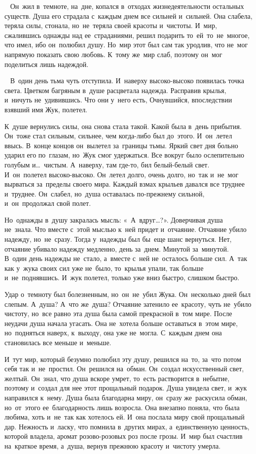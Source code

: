 ~
Он~жил в~темноте, на~дне, копался в~отходах жизнедеятельности остальных существ.
Душа его страдала с~каждым днем все сильней и~сильней.
Она слабела, теряла силы, стонала, но~не~теряла своей красоты и~чистоты.
И~мир, сжалившись однажды над ее~страданиями, решил подарить то~ей~то~не~многое, что имел, ибо он~полюбил душу.
Но~мир этот был сам так уродлив, что не~мог напрямую показать свою любовь.
К~тому же~мир слаб, поэтому он~мог поделиться лишь надеждой.

~
В~один день тьма чуть отступила.
И~наверху высоко-высоко появилась точка света.
Цветком багряным в~душе расцветала надежда.
Расправив крылья, и~ничуть не~удивившись.
Что они у~него есть, Очнувшийся, впоследствии взявший имя Жук, полетел.
 
К~душе вернулись силы, она снова стала такой.
Какой была в~день прибытия.
Он~тоже стал сильным, сильнее, чем когда-либо был до~этого.
И~он~летел ввысь.
В~конце концов он~вылетел за~границы тьмы.
Яркий свет дня больно ударил его по~глазам, но~Жук смог удержаться.
Все вокруг было ослепительно голубым и…~чистым.
А~наверху, там где-то, бил белый-белый свет.
И~он~полетел высоко-высоко.
Он~летел долго, очень долго, но~так и~не~мог вырваться за~пределы своего мира.
Каждый взмах крыльев давался все труднее и~труднее.
Он~слабел, но~душа оставалась по-прежнему сильной, и~он~продолжал свой полет.
 
Но~однажды в~душу закралась мысль: «~А~вдруг…?».
Доверчивая душа не~знала.
Что вместе с~этой мыслью к~ней придет и~отчаяние.
Отчаяние убило надежду, но~не~сразу.
Тогда у~надежды был бы~еще шанс вернуться.
Нет, отчаяние убивало надежду медленно, день за~днем.
Минутой за~минутой.
В~один день надежды не~стало, а~вместе с~ней не~осталось больше сил.
А~так как у~жука своих сил уже не~было, то~крылья упали, так больше и~не~поднявшись.
И~жук полетел, только уже вниз быстро, слишком быстро.
 
Удар о~темноту был болезненным, но~он~не~убил Жука.
Он~несколько дней был слепым.
А~душа? А~что же~душа? Отчаяние затенило ее~красоту, чуть не~убило чистоту, но~все равно эта душа была самой прекрасной в~том мире.
После неудачи душа начала угасать.
Она не~хотела больше оставаться в~этом мире, но~подняться наверх, к~выходу, она уже не~могла.
С~каждым днем она становилась все меньше и~меньше.
 
И~тут мир, который безумно полюбил эту душу, решился на~то, за~что потом себя так и~не~простил.
Он~решился на~обман.
Он~создал искусственный свет, желтый.
Он~знал, что душа вскоре умрет, то~есть растворится в~небытие, поэтому и~создал для нее этот прощальный подарок.
Душа увидела свет, и~жук направился к~нему.
Душа была благодарна миру, он~сразу же~раскусила обман, но~от~этого ее~благодарность лишь возросла.
Она внезапно поняла, что была любима, хоть и~не~так как хотелось ей.
И~она послала миру свой прощальный дар.
Нежность и~ласку, что помнила в~других мирах, а~единственную ценность, которой владела, аромат розово-розовых роз после грозы.
И~мир был счастлив на~краткое время, а~душа, вернув прежнюю красоту и~чистоту умерла.
 

